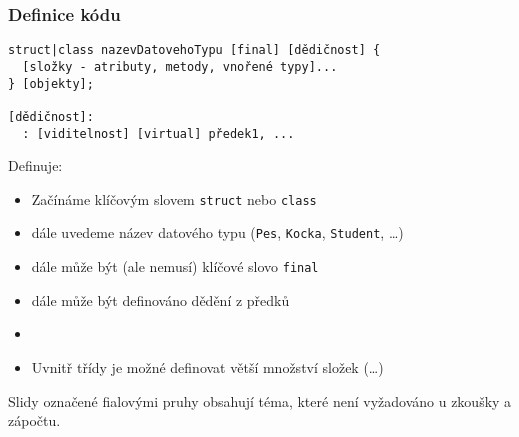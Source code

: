 \begin{frame}[fragile]
\frametitle{Definice kódu}

\begin{noteblock}{}
\begin{lstlisting}[basicstyle=\small]
struct|class nazevDatovehoTypu [final] [dědičnost] {
  [složky - atributy, metody, vnořené typy]...
} [objekty];

[dědičnost]:
  : [viditelnost] [virtual] předek1, ...
\end{lstlisting}
\end{noteblock}

\begin{block}{Definuje:}
\begin{itemize}
\item Začínáme klíčovým slovem \lstinline|struct| nebo \lstinline|class|
\item dále uvedeme název datového typu (\lstinline|Pes|, \lstinline|Kocka|, \lstinline|Student|, \ldots)
\item dále může být (ale nemusí) klíčové slovo \lstinline|final|
\item dále může být definováno dědění z předků
\item[]
\item Uvnitř třídy je možné definovat větší množství složek (\ldots)
\end{itemize}

\end{block}
\end{frame}








\nezkouskove
\begin{frame}[fragile]
\begin{center}
\large Slidy označené fialovými pruhy obsahují téma, které není vyžadováno u zkoušky a zápočtu.
\end{center}
\end{frame}
\zkouskove